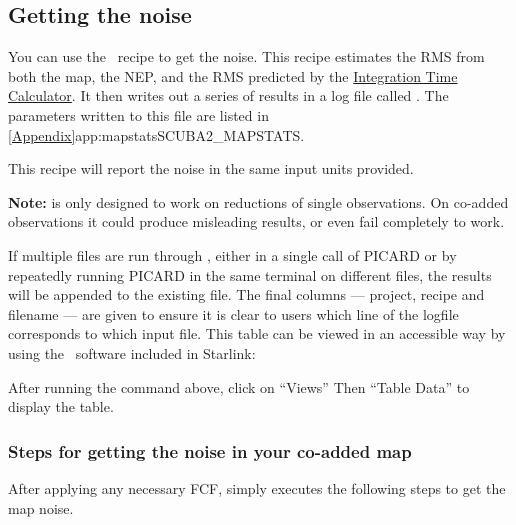 \subsection{Getting the noise}
\label{sec:mapstats}

You can use the \picard\ recipe  to get the
noise. This recipe estimates the RMS from both the map, the NEP, and
the RMS predicted by the
 \href{https://www.eaobservatory.org/jcmt/instrumentation/continuum/scuba-2/itc/}{Integration
 Time Calculator}. It then writes out
a series of results in a log file called . The
parameters written to this file are listed in
\cref{Appendix}{app:mapstats}{SCUBA2_MAPSTATS}.

\begin{terminalv}
\end{terminalv}
This recipe will report the noise in the same input units provided.


\textbf{Note:}  is only designed to work on
reductions of single observations. On co-added observations it could
produce misleading results, or even fail completely to work.

If multiple files are run through , either in a single call
of PICARD or by repeatedly running PICARD in the same terminal on different
files, the results will be appended to the existing  file.
The final columns — project, recipe and filename — are given to ensure it
is clear to users which line of the logfile corresponds to which input file.
This table can be viewed in an accessible way by using the \topcat\ software
included in Starlink:

\begin{terminalv}
\end{terminalv}

After running the command above, click on “Views” Then “Table Data” to display the table.

\subsubsection*{Steps for getting the noise in your co-added map}
After applying any necessary FCF,  simply
executes the following steps to get the map noise.

